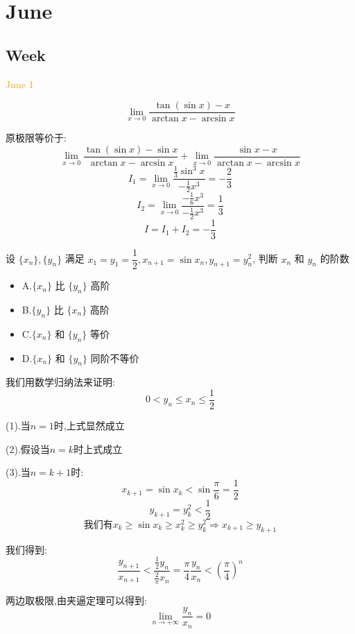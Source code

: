 \chapter{June}
\section{Week }
\textcolor{orange}{June 1}

\begin{example}[][Exam: 32.1.1]
	$$\lim\limits_{x\to 0}\dfrac{\tan(\sin x)-x}{\arctan x-\arcsin x}$$
\end{example}

\begin{solution}
	
	原极限等价于: 
	$$\lim\limits_{x\to 0}\dfrac{\tan(\sin x)-\sin x}{\arctan x-\arcsin x}+\lim\limits_{x\to 0}\dfrac{\sin x-x}{\arctan x-\arcsin x}$$
	$$I_{1}=\lim\limits_{x\to 0}\dfrac{\frac{1}{3}\sin^3 x}{-\frac{1}{2}x^3}=-\frac{2}{3}$$
	$$I_{2}=\lim\limits_{x\to 0}\dfrac{-\frac{1}{6} x^3}{-\frac{1}{2}x^3}=\frac{1}{3}$$
	$$I=I_{1}+I_{2}=-\frac{1}{3}$$
\end{solution}

\begin{example}[][Exam: 32.1.2]
	设 $\{x_{n}\},\{y_{n}\}$ 满足 $x_{1}=y_{1}=\dfrac{1}{2},x_{n+1}=\sin x_{n},y_{n+1}=y_{n}^2$, 判断 $x_{n}$ 和 $y_{n}$ 的阶数
	\begin{itemize}
		\item A.$\{x_{n}\}$ 比 $\{y_{n}\}$ 高阶
		\item B.$\{y_{n}\}$ 比 $\{x_{n}\}$ 高阶
		\item C.$\{x_{n}\}$ 和 $\{y_{n}\}$ 等价
		\item D.$\{x_{n}\}$ 和 $\{y_{n}\}$ 同阶不等价
	\end{itemize}
\end{example}

\begin{solution}
	
	我们用数学归纳法来证明: 
	$$0<y_{n}\leq x_{n}\leq \frac{1}{2}$$
	
	(1).当$n=1$时,上式显然成立
	
	(2).假设当$n=k$时上式成立
	
	(3).当$n=k+1$时: 
	$$x_{k+1}=\sin x_{k}<\sin \frac{\pi}{6}=\frac{1}{2}$$
	$$y_{k+1}=y_{k}^2<\frac{1}{2}$$
	$$\text{我们有}x_{k}\geq \sin x_{k}\geq x_{k}^2\geq y_{k}^2\Rightarrow x_{k+1}\geq y_{k+1}$$
	
	我们得到: 
	$$\dfrac{y_{n+1}}{x_{n+1}}<\dfrac{\frac{1}{2}y_{n}}{\frac{2}{\pi}x_{n}}=\dfrac{\pi}{4}\dfrac{y_{n}}{x_{n}}<(\dfrac{\pi}{4})^n$$
	
	两边取极限,由夹逼定理可以得到: 
	$$\lim\limits_{n\to +\infty}\frac{y_{n}}{x_{n}}=0$$
\end{solution}


